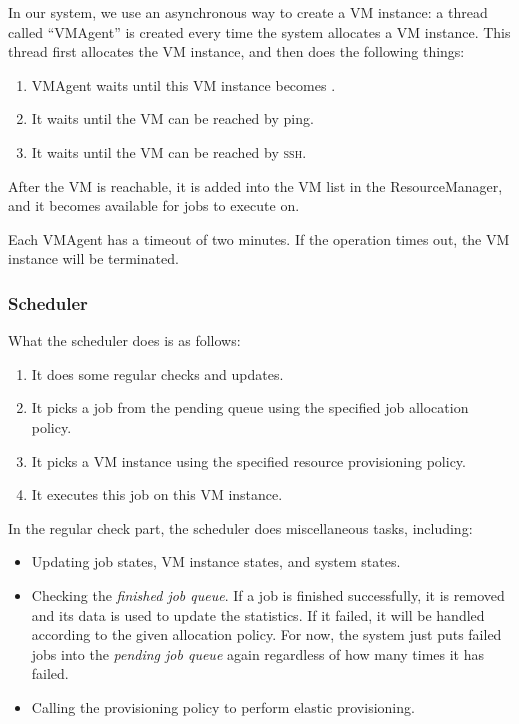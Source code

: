 In our system, we use an asynchronous way to create a VM instance: a
thread called ``VMAgent'' is created every time the system allocates a
VM instance. This thread first allocates the VM instance, and then
does the following things:

\begin{enumerate}
\item VMAgent waits until this VM instance becomes \staterunning.
\item It waits until the VM can be reached by ping.
\item It waits until the VM can be reached by \textsc{ssh}.
\end{enumerate}

After the VM is reachable, it is added into the VM list in the
ResourceManager, and it becomes available for jobs to execute on.

Each VMAgent has a timeout of two minutes. If the operation times out,
the VM instance will be terminated.

\subsubsection{Scheduler}
What the scheduler does is as follows:

\begin{enumerate}
\item It does some regular checks and updates.
\item It picks a job from the pending queue using the specified job
  allocation policy.
\item It picks a VM instance using the specified resource provisioning
  policy.
\item It executes this job on this VM instance.
\end{enumerate}

In the regular check part, the scheduler does miscellaneous tasks,
including:
\begin{itemize}
\item Updating job states, VM instance states, and system states.
\item Checking the \emph{finished job queue}. If a job is finished
  successfully, it is removed and its data is used to update the
  statistics. If it failed, it will be handled according to the given
  allocation policy. For now, the system just puts failed jobs into
  the \emph{pending job queue} again regardless of how many times it
  has failed.
\item Calling the provisioning policy to perform elastic provisioning.
\end{itemize}

